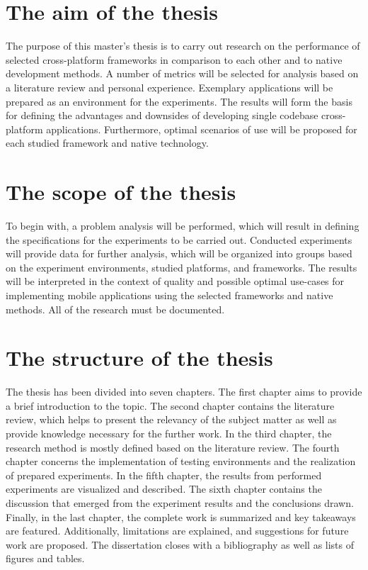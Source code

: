 

\section{The aim of the thesis}

The purpose of this master's thesis is to carry out research on the performance of selected cross-platform frameworks in comparison to each other and to native development methods. A number of metrics will be selected for analysis based on a literature review and personal experience. Exemplary applications will be prepared as an environment for the experiments. The results will form the basis for defining the advantages and downsides of developing single codebase cross-platform applications. Furthermore, optimal scenarios of use will be proposed for each studied framework and native technology.

\section{The scope of the thesis}

To begin with, a problem analysis will be performed, which will result in defining the specifications for the experiments to be carried out. Conducted experiments will provide data for further analysis, which will be organized into groups based on the experiment environments, studied platforms, and frameworks. The results will be interpreted in the context of quality and possible optimal use-cases for implementing mobile applications using the selected frameworks and native methods. All of the research must be documented.

\section{The structure of the thesis}

The thesis has been divided into seven chapters. The first chapter aims to provide a brief introduction to the topic. The second chapter contains the literature review, which helps to present the relevancy of the subject matter as well as provide knowledge necessary for the further work. In the third chapter, the research method is mostly defined based on the literature review. The fourth chapter concerns the implementation of testing environments and the realization of prepared experiments. In the fifth chapter, the results from performed experiments are visualized and described. The sixth chapter contains the discussion that emerged from the experiment results and the conclusions drawn. Finally, in the last chapter, the complete work is summarized and key takeaways are featured. Additionally, limitations are explained, and suggestions for future work are proposed. The dissertation closes with a bibliography as well as lists of figures and tables.
